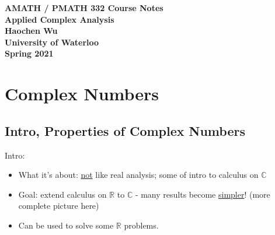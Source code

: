 \documentclass[12pt,titlepage]{article}
\let\stdsection\section
\renewcommand\section{\clearpage\stdsection}
\begin{document}
\begin{titlepage}
	\vspace*{\fill}
	\centering
		
	\textbf{\Huge AMATH / PMATH 332 Course Notes} \\ [0.4em]
	\textbf{\Large Applied Complex Analysis} \\ [1em]
	\textbf{\Large Haochen Wu} \\ [1em]
	\textbf{\large University of Waterloo} \\
	\textbf{\large Spring 2021} \\
	\vspace*{\fill}
\end{titlepage}

\newpage 


\tableofcontents
\newpage


\section{Complex Numbers}
\subsection{Intro, Properties of Complex Numbers}
Intro: \begin{itemize}
	\item What it's about: \underline{not} like real analysis; some of intro to calculus on $\mathbb{C}$
	\item Goal: extend calculus on $\mathbb{R}$ to $\mathbb{C}$ - many results become \underline{simpler}! (more complete picture here)
	\item Can be used to solve some $\mathbb{R}$ problems. 
\end{itemize}
\end{document}
